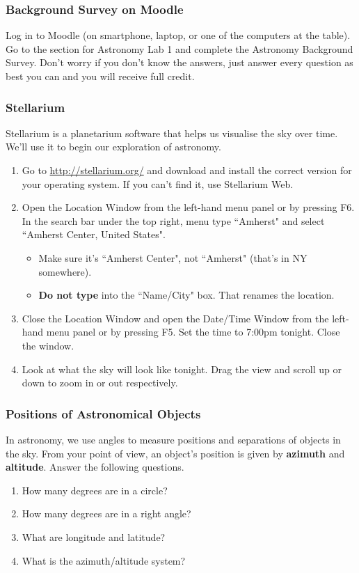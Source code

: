 \documentclass[main.tex]{subfiles}
\begin{document}
\subsubsection{Background Survey on Moodle}
Log in to Moodle (on smartphone, laptop, or one of the computers at the table). Go to the section for Astronomy Lab 1 and complete the Astronomy Background Survey. Don't worry if you don't know the answers, just answer every question as best you can and you will receive full credit.

\subsubsection{Stellarium}
Stellarium is a planetarium software that helps us visualise the sky over time. We'll use it to begin our exploration of astronomy.
\begin{enumerate}
\item Go to \url{http://stellarium.org/} and download and install the correct version for your operating system. If you can't find it, use Stellarium Web.
\item Open the Location Window from the left-hand menu panel or by pressing F6. In the search bar under the top right, menu type ``Amherst" and select ``Amherst Center, United States".
	\begin{itemize}
	\item Make sure it's ``Amherst Center", not ``Amherst" (that's in NY somewhere).
	\item \textbf{Do not type} into the ``Name/City" box. That renames the location.
	\end{itemize}
\item Close the Location Window and open the Date/Time Window from the left-hand menu panel or by pressing F5. Set the time to 7:00pm tonight. Close the window.
\item Look at what the sky will look like tonight. Drag the view and scroll up or down to zoom in or out respectively.
\end{enumerate}

\subsubsection{Positions of Astronomical Objects}
In astronomy, we use angles to measure positions and separations of objects in the sky. From your point of view, an object's position is given by \textbf{azimuth} and \textbf{altitude}. Answer the following questions.
\begin{enumerate}
\item How many degrees are in a circle?
\item How many degrees are in a right angle?
\item What are longitude and latitude?
\item What is the azimuth/altitude system?
\end{enumerate}
\end{document}
